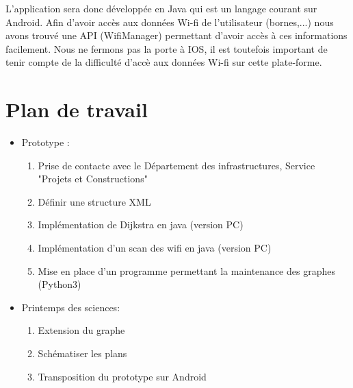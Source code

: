 \documentclass[a4paper,11pt]{article}
\begin{document}
	L'application sera donc développée en Java qui est un langage courant sur Android. Afin d'avoir accès aux données Wi-fi de l'utilisateur (bornes,...) nous avons trouvé
	une API (WifiManager) permettant d'avoir accès à ces informations facilement.
	Nous ne fermons pas la porte à IOS, il est toutefois important de tenir compte de la difficulté d'accè aux données Wi-fi sur cette plate-forme.

\section{Plan de travail}
  \begin{itemize}
	\item Prototype :
	  \begin{enumerate}
	    \item Prise de contacte avec le Département des infrastructures, Service "Projets et Constructions"
	    \item Définir une structure XML
	    \item Implémentation de Dijkstra en java (version PC)
	    \item Implémentation d'un scan des wifi en java (version PC)
	    \item Mise en place d'un programme permettant la maintenance des graphes (Python3)
	  \end{enumerate}
	\item Printemps des sciences:
	  \begin{enumerate}
	    \item Extension du graphe
	    \item Schématiser les plans
	    \item Transposition du prototype sur Android
	  \end{enumerate}
  \end{itemize}
\end{document}
